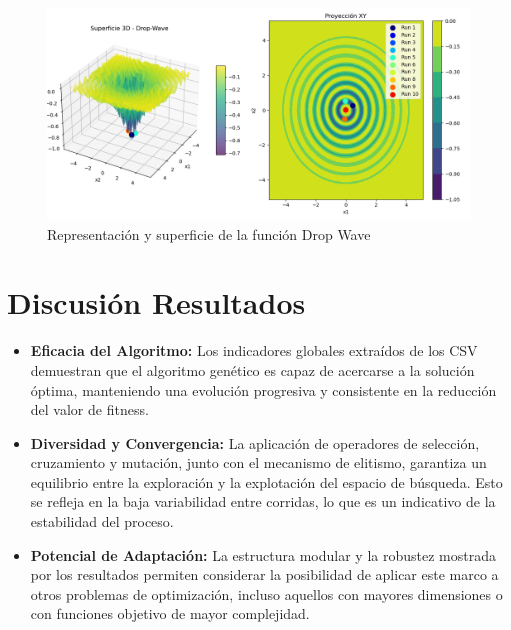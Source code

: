 \begin{figure}[H]
    \centering
    \includegraphics[width=\textwidth]{secciones/tablas/drop_wave/surface_3d_drop_wave.png}
    \caption{Representación y superficie de la función Drop Wave}
    \label{fig:surface_drop_wave}
\end{figure}

\section{Discusión Resultados}

\begin{itemize}
    \item \textbf{Eficacia del Algoritmo:} Los indicadores globales extra\'idos de los CSV demuestran que el algoritmo gen\'etico es capaz de acercarse a la soluci\'on \'optima, manteniendo una evoluci\'on progresiva y consistente en la reducci\'on del valor de fitness.
    
    \item \textbf{Diversidad y Convergencia:} La aplicaci\'on de operadores de selecci\'on, cruzamiento y mutaci\'on, junto con el mecanismo de elitismo, garantiza un equilibrio entre la exploraci\'on y la explotaci\'on del espacio de b\'usqueda. Esto se refleja en la baja variabilidad entre corridas, lo que es un indicativo de la estabilidad del proceso.
    
    \item \textbf{Potencial de Adaptaci\'on:} La estructura modular y la robustez mostrada por los resultados permiten considerar la posibilidad de aplicar este marco a otros problemas de optimizaci\'on, incluso aquellos con mayores dimensiones o con funciones objetivo de mayor complejidad.
\end{itemize}

